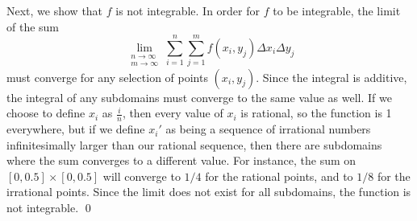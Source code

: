 \documentclass{article}
\let\cross\times%
\begin{document}
\begin{enumerate}[leftmargin=*]
  Next, we show that $f$ is not integrable.
  In order for $f$ to be integrable, the limit of the sum
  \[ \lim_{\substack{n \to \infty \\ m \to \infty}}\sum_{i = 1}^n \sum_{j = 1}^m f(x_i, y_j) \Delta x_i \Delta y_j \]
  must converge for any selection of points $(x_i, y_j)$.
  Since the integral is additive, the integral of any subdomains must converge to the same value as well.
  If we choose to define $x_i$ as $\frac{i}{n}$, then every value of $x_i$ is rational, so the function is 1 everywhere, but if we define $x_i'$ as being a sequence of irrational numbers infinitesimally larger than our rational sequence, then there are subdomains where the sum converges to a different value.
  For instance, the sum on $\left[0, 0.5\right] \cross \left[0, 0.5 \right]$ will converge to $1/4$ for the rational points, and to $1/8$ for the irrational points.
  Since the limit does not exist for all subdomains, the function is not integrable. \qed%
\end{enumerate}
\end{document}
